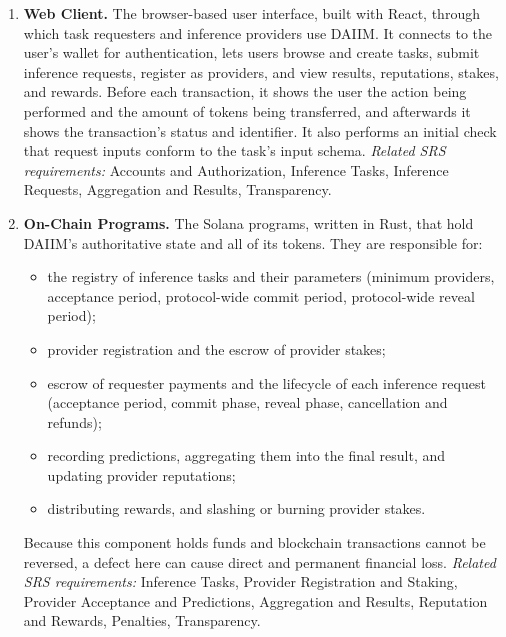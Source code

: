 \documentclass{article}
\begin{document}
\begin{enumerate}

\item \textbf{Web Client.} The browser-based user interface, built with React,
through which task requesters and inference providers use DAIIM. It connects to
the user's wallet for authentication, lets users browse and create tasks,
submit inference requests, register as providers, and view results,
reputations, stakes, and rewards. Before each transaction, it shows the user
the action being performed and the amount of tokens being transferred, and
afterwards it shows the transaction's status and identifier. It also performs
an initial check that request inputs conform to the task's input schema.
\textit{Related SRS requirements:} Accounts and Authorization, Inference Tasks,
Inference Requests, Aggregation and Results, Transparency.

\item \textbf{On-Chain Programs.} The Solana programs, written in Rust, that
hold DAIIM's authoritative state and all of its tokens. They are responsible
for:
\begin{itemize}
  \item the registry of inference tasks and their parameters (minimum
  providers, acceptance period, protocol-wide commit period, protocol-wide reveal period);
  \item provider registration and the escrow of provider stakes;
  \item escrow of requester payments and the lifecycle of each inference
  request (acceptance period, commit phase, reveal phase, cancellation and refunds);
  \item recording predictions, aggregating them into the final result, and
  updating provider reputations;
  \item distributing rewards, and slashing or burning provider stakes.
\end{itemize}
Because this component holds funds and blockchain transactions cannot be
reversed, a defect here can cause direct and permanent financial loss.
\textit{Related SRS requirements:} Inference Tasks, Provider Registration and
Staking, Provider Acceptance and Predictions, Aggregation and Results,
Reputation and Rewards, Penalties, Transparency.


\end{enumerate}
\end{document}

